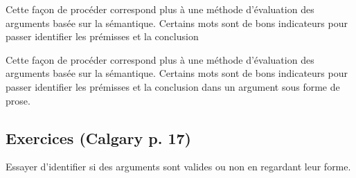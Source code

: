 \documentclass[fleqn,a4paper,nobib]{tufte-handout}
\begin{document}
Cette façon de procéder correspond plus à une méthode d'évaluation
des arguments basée sur la sémantique. Certains mots sont de bons
indicateurs pour passer identifier les prémisses et la conclusion

Cette façon de procéder correspond plus à une méthode d'évaluation
des arguments basée sur la sémantique. Certains mots sont de bons
indicateurs pour passer identifier les prémisses et la conclusion
dans un argument sous forme de prose.
\begin{marginfigure}[-5cm]
\end{marginfigure}

\subsection*{Exercices (Calgary p. 17)}

Essayer d'identifier si des arguments sont valides ou non en
regardant leur forme.
\end{document}
